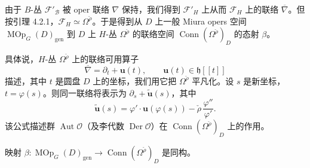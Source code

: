 由于 $B$-丛 $\mathcal F'_{\mathcal B}$ 被 oper 联络 $\nabla$ 保持，我们得到 $\mathcal F'_H$ 上从而 $\mathcal F_H$ 上的联络 $\overline\nabla$。但按引理 4.2.1，$\mathcal F_H\simeq\Omega^{\check\rho}$。于是得到从 $D$ 上一般 Miura opers 空间 $\operatorname{MOp}_G(D)_{\mathrm{gen}}$ 到 $D$ 上 $H$-丛 $\Omega^{\check\rho}$ 的联络空间 $\operatorname{Conn}(\Omega^{\check\rho})_D$ 的态射 $\beta$。

具体说，$H$-丛 $\Omega^{\check\rho}$ 上的联络可用算子
\[
    \overline\nabla=\partial_t+\mathbf u(t),\qquad \mathbf u(t)\in\mathfrak h[\![t]\!]
\]
描述，其中 $t$ 是圆盘 $D$ 上的坐标，我们用它把 $\Omega^{\check\rho}$ 平凡化。设 $s$ 是新坐标，$t=\varphi(s)$。则同一联络将表示为 $\partial_s+\tilde{\mathbf u}(s)$，其中
\begin{equation}
    \tilde{\mathbf u}(s)=\varphi'\cdot\mathbf u(\varphi(s))-\check\rho\,\frac{\varphi''}{\varphi'}.
    \tag{8.2-2}
\end{equation}
该公式描述群 $\operatorname{Aut}\mathcal O$（及李代数 $\operatorname{Der}\mathcal O$）在 $\operatorname{Conn}(\Omega^{\check\rho})_D$ 上的作用。

\begin{proposition}
    映射 $\beta:\operatorname{MOp}_G(D)_{\mathrm{gen}}\to\operatorname{Conn}(\Omega^{\check\rho})_D$ 是同构。
\end{proposition}


